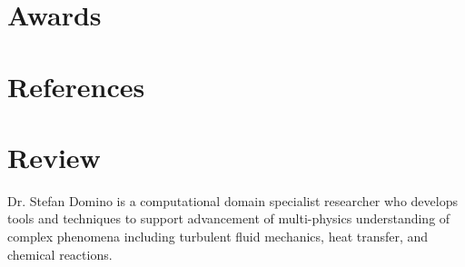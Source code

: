 \documentclass[letterpaper]{twentysecondcv_spd} %
\begin{document}
\section{Awards}

\begin{twentyshort} %
\end{twentyshort}


\section{References}

\begin{twentysingle} %
\end{twentysingle}

\section{Review}

Dr. Stefan Domino is a computational domain specialist researcher who develops tools and techniques
to support advancement of multi-physics understanding of complex phenomena including turbulent 
fluid mechanics, heat transfer, and chemical reactions. 
\end{document}
